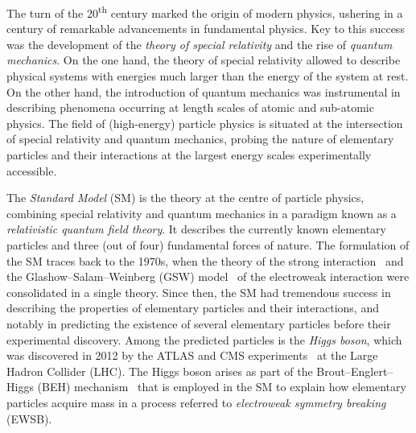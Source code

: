 The turn of the 20\textsuperscript{th} century marked the origin of modern
physics, ushering in a century of remarkable advancements in fundamental
physics. Key to this success was the development of the \emph{theory of special
  relativity} and the rise of \emph{quantum mechanics}. On the one hand, the
theory of special relativity
allowed to describe physical systems with energies much larger than the energy
of the system at rest. On the other hand, the introduction of quantum mechanics
was instrumental in describing phenomena occurring at length scales of atomic
and sub-atomic physics. The field of (high-energy) particle physics is situated
at the intersection of special relativity and quantum mechanics, probing the
nature of elementary particles and their interactions at the largest energy
scales experimentally accessible.

The \emph{Standard Model} (SM) is the theory at the centre of particle physics,
combining special relativity and quantum mechanics in a paradigm known as a
\emph{relativistic quantum field theory}. It describes the currently known
elementary particles and three (out of four) fundamental forces of nature. The
formulation of the SM traces back to the 1970s, when the theory of the strong
interaction~\cite{Fritzsch:1973pi,Gross:1973id,Politzer:1973fx}
and the Glashow--Salam--Weinberg (GSW)
model~\cite{Glashow:1961tr,Salam:1964ry,Weinberg:1967tq} of the electroweak
interaction were consolidated in a single theory. Since then, the SM had
tremendous success in describing the properties of elementary particles and
their interactions, and notably in predicting the existence of several
elementary particles before their experimental discovery. Among the predicted
particles is the \emph{Higgs boson}, which was discovered in 2012 by the ATLAS
and CMS experiments~\cite{HIGG-2012-27,CMS-HIG-12-028} at the Large Hadron
Collider (LHC). The Higgs boson arises as part of the Brout--Englert--Higgs
(BEH) mechanism~\cite{Englert:1964et,Higgs:1964pj}
that is employed in the SM to explain how elementary
particles acquire mass in a process referred to \emph{electroweak symmetry
  breaking} (EWSB).
%
%

